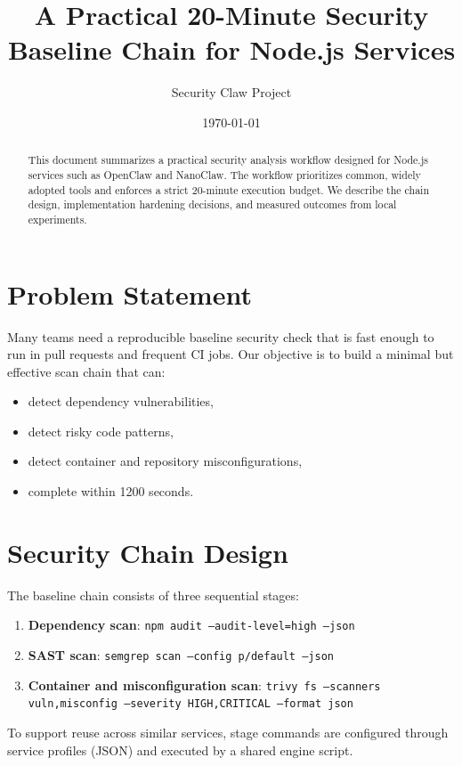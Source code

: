 \documentclass[11pt,a4paper]{article}
\title{A Practical 20-Minute Security Baseline Chain for Node.js Services}
\author{Security Claw Project}
\date{\today}
\begin{document}
\maketitle

\begin{abstract}
This document summarizes a practical security analysis workflow designed for Node.js services such as OpenClaw and NanoClaw. The workflow prioritizes common, widely adopted tools and enforces a strict 20-minute execution budget. We describe the chain design, implementation hardening decisions, and measured outcomes from local experiments.
\end{abstract}

\section{Problem Statement}
Many teams need a reproducible baseline security check that is fast enough to run in pull requests and frequent CI jobs. Our objective is to build a minimal but effective scan chain that can:
\begin{itemize}[leftmargin=1.5em]
  \item detect dependency vulnerabilities,
  \item detect risky code patterns,
  \item detect container and repository misconfigurations,
  \item complete within 1200 seconds.
\end{itemize}

\section{Security Chain Design}
The baseline chain consists of three sequential stages:
\begin{enumerate}[leftmargin=1.5em]
  \item \textbf{Dependency scan}: \texttt{npm audit --audit-level=high --json}
  \item \textbf{SAST scan}: \texttt{semgrep scan --config p/default --json}
  \item \textbf{Container and misconfiguration scan}: \texttt{trivy fs --scanners vuln,misconfig --severity HIGH,CRITICAL --format json}
\end{enumerate}

To support reuse across similar services, stage commands are configured through service profiles (JSON) and executed by a shared engine script.
\end{document}
